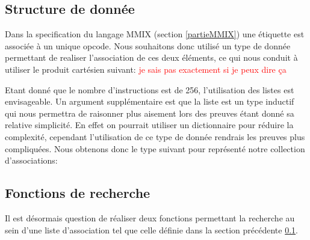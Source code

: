 \documentclass {article}
\newcommand{\codefrom}[3]
           {}
\theoremstyle{definition}
\theoremstyle{remark}
\newcommand{\todo}[1]{\textcolor{red}{#1}}
\begin{document}
\subsection{Structure de donnée}
\label{Structure de donnee}
Dans la specification du langage MMIX (section \ref{partieMMIX})
une étiquette est associée à un unique opcode. Nous souhaitons donc
utilisé un type de donnée permettant de realiser l'association de ces deux éléments,
ce qui nous conduit à utiliser le produit cartésien suivant: \todo{je sais pas exactement si je peux dire ça}
\codefrom{src}{association_list}{assoc}

Etant donné que le nombre
d'instructions est de 256, l'utilisation des listes est envisageable.
Un argument supplémentaire est que la liste
est un type inductif qui nous permettra de raisonner plus aisement
lors des preuves étant donné sa relative simplicité. En effet on pourrait utiliser
un dictionnaire pour réduire la complexité, cependant l'utilisation de ce 
type de donnée rendrais les preuves plus compliquées.
Nous obtenons donc le type suivant pour représenté notre collection d'associations:

\codefrom{src}{association_list}{tag_opcode_assoc}



\subsection{Fonctions de recherche}

Il est désormais question de réaliser deux fonctions permettant la recherche
au sein d'une liste d'association tel que celle définie dans la section précédente
\ref{Structure de donnee}.

\codefrom{src}{association_list}{lookup}
\end{document}
